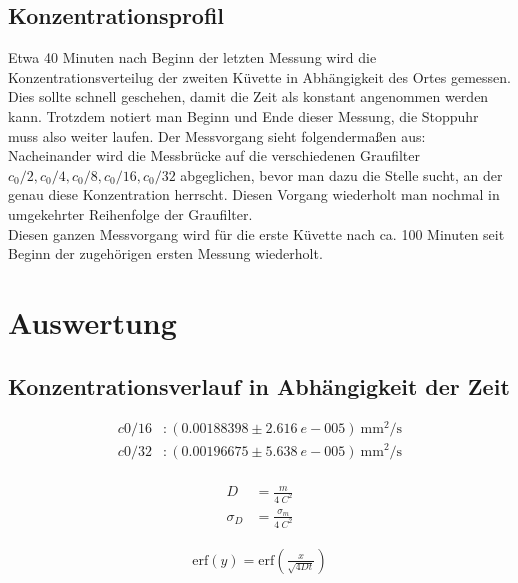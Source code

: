 \documentclass[12pt,a4paper,titlepage,headinclude,bibtotoc]{scrartcl}
\newcommand{\erf}{\ensuremath{\text{erf}}}
\begin{document}
\subsection{Konzentrationsprofil}
Etwa 40 Minuten nach Beginn der letzten Messung wird die Konzentrationsverteilug der zweiten Küvette in Abhängigkeit des Ortes gemessen.
Dies sollte schnell geschehen, damit die Zeit als konstant angenommen werden kann.
Trotzdem notiert man Beginn und Ende dieser Messung, die Stoppuhr muss also weiter laufen.
Der Messvorgang sieht folgendermaßen aus:
Nacheinander wird die Messbrücke auf die verschiedenen Graufilter $c_0/2, c_0/4, c_0/8, c_0/16, c_0/32$ abgeglichen, bevor man dazu die Stelle sucht, an der genau diese Konzentration herrscht.
Diesen Vorgang wiederholt man nochmal in umgekehrter Reihenfolge der Graufilter.\\
Diesen ganzen Messvorgang wird für die erste Küvette nach ca. 100 Minuten  seit Beginn der zugehörigen ersten Messung wiederholt. 

\section{Auswertung}
\label{sec:auswertung}
\subsection{Konzentrationsverlauf in Abhängigkeit der Zeit}
\begin{figure}
	
\end{figure}


\begin{figure}
	
\end{figure}


\begin{align*}
	c0/16&: (0.00188398 \pm 2.616~e-005)~\si{\milli \meter ^2 / \second}\\
	c0/32&: (0.00196675 \pm 5.638~e-005) ~\si{\milli \meter ^2 / \second}\\
\end{align*}

\begin{align}
	D&=\frac{m}{4~C^2}\\
	\sigma_D&=\frac{\sigma_m}{4~C^2}
\end{align}

\begin{align}
	\erf(y)=\erf\left(\frac{x}{\sqrt{4Dt}}\right)
\end{align}
\end{document}
